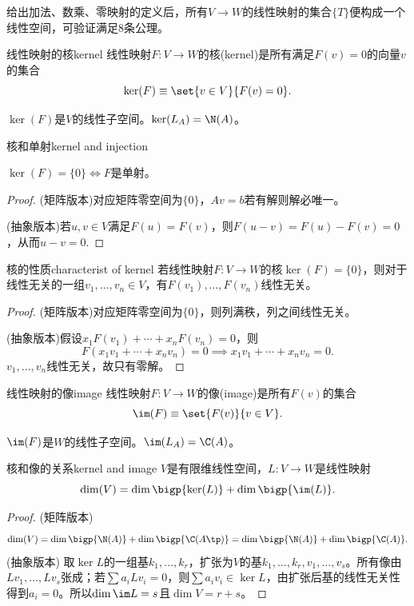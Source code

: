 给出加法、数乘、零映射的定义后，所有$V\to W$的线性映射的集合$\{T\}$便构成一个线性空间，可验证满足8条公理。
\begin{definition}{线性映射的核}{kernel}
	线性映射$F:V\to W$的核(kernel)是所有满足$F(v)=0$的向量$v$的集合
	\[
		\ker(F)\equiv\set{v\in V}{F(v)=0}.
	\]
\end{definition}
\begin{corollary}
	$\ker(F)$是$V$的线性子空间。$\ker (L_A)=\N(A)$。
\end{corollary}
\begin{theorem}{核和单射}{kernel and injection}
	\begin{center}
		$\ker(F)=\{0\}\iff F$是单射。
	\end{center}
\end{theorem}
\begin{proof}
	(矩阵版本)对应矩阵零空间为$\{0\}$，$Av=b$若有解则解必唯一。
	
	(抽象版本)若$u,v\in V$满足$F(u)=F(v)$，则$F(u-v)=F(u)-F(v)=0$，从而$u-v=0.$
\end{proof}
\begin{theorem}{核的性质}{characterist of kernel}
	若线性映射$F:V\to W$的核$\ker(F)=\{0\}$，则对于线性无关的一组$v_1,\ldots,v_n\in V$，有$F(v_1),\ldots,F(v_n)$线性无关。
\end{theorem}
\begin{proof}
	(矩阵版本)对应矩阵零空间为$\{0\}$，则列满秩，列之间线性无关。
	
	(抽象版本)假设$x_1F(v_1)+\cdots+x_nF(v_n)=0$，则
	\[
		F(x_1v_1+\cdots+x_nv_n)=0\implies x_1v_1+\cdots+x_nv_n=0.
	\]
	$v_1,\ldots,v_n$线性无关，故只有零解。
\end{proof}
\begin{definition}{线性映射的像}{image}
	线性映射$F:V\to W$的像(image)是所有$F(v)$的集合
	\[
		\im(F)\equiv\set{F(v)}{v\in V}.
	\]
\end{definition}
\begin{corollary}
	$\im(F)$是$W$的线性子空间。$\im(L_A)=\C(A)$。
\end{corollary}
\begin{theorem}{核和像的关系}{kernel and image}
	$V$是有限维线性空间，$L:V\to W$是线性映射
	\begin{equation}
		\dim(V)=\dim\bigp{\ker(L)}+\dim\bigp{\im(L)}.
	\end{equation}
\end{theorem}
\begin{proof}
	(矩阵版本)
	\[
		\dim(V)=\dim\bigp{\N(A)}+\dim\bigp{\C(A\tp)}=\dim\bigp{\N(A)}+\dim\bigp{\C(A)}.
	\]
    (抽象版本) 取$\ker L$的一组基$k_1,\ldots,k_r$，扩张为$V$的基$k_1,\ldots,k_r,v_1,\ldots,v_s$。所有像由$Lv_1,\ldots,Lv_s$张成；若$\sum a_iLv_i=0$，则$\sum a_iv_i\in\ker L$，由扩张后基的线性无关性得到$a_i=0$。所以$\dim\im L=s$且$\dim V=r+s$。
\end{proof}
